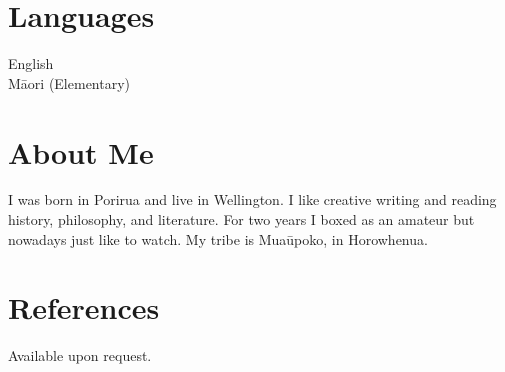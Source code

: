 \documentclass[margin,line]{res}
\begin{document}
\begin{resume}
\section{\sc Languages}
English\\
M\=aori (Elementary)

\section{\sc About Me}
I was born in Porirua and live in Wellington. I like creative writing and reading history, philosophy, and literature. For two years I boxed as an amateur but nowadays just like to watch. My tribe is Mua\=upoko, in Horowhenua.

\section{\sc References}
Available upon request.

\end{resume}
\end{document}
